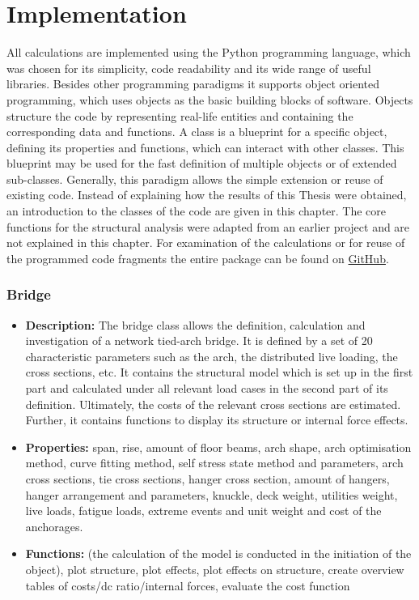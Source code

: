 \chapter{Implementation}
All calculations are implemented using the Python programming language, which was chosen for its simplicity, code readability and its wide range of useful libraries. Besides other programming paradigms it supports object oriented programming, which uses objects as the basic building blocks of software. Objects structure the code by representing real-life entities and containing the corresponding data and functions. A class is a blueprint for a specific object, defining its properties and functions, which can interact with other classes. This blueprint may be used for the fast definition of multiple objects or of extended sub-classes. Generally, this paradigm allows the simple extension or reuse of existing code. Instead of explaining how the results of this Thesis were obtained, an introduction to the classes of the code are given in this chapter. The core functions for the structural analysis were adapted from an earlier project and are not explained in this chapter. For examination of the calculations or for reuse of the programmed code fragments the entire package can be found on \href{https://github.com/uridmo/networkarchoptimization}{GitHub}.

\subsection*{Bridge}
\begin{itemize}
    \item {\bf Description:} The bridge class allows the definition, calculation and investigation of a network tied-arch bridge. It is defined by a set of 20 characteristic parameters such as the arch, the distributed live loading, the cross sections, etc. It contains the structural model which is set up in the first part and calculated under all relevant load cases in the second part of its definition. Ultimately, the costs of the relevant cross sections are estimated. Further, it contains functions to display its structure or internal force effects.
    \item {\bf Properties:} span, rise, amount of floor beams, arch shape, arch optimisation method, curve fitting method, self stress state method and parameters, arch cross sections, tie cross sections, hanger cross section, amount of hangers, hanger arrangement and parameters, knuckle, deck weight, utilities weight, live loads, fatigue loads, extreme events and unit weight and cost of the anchorages.
    \item {\bf Functions:} (the calculation of the model is conducted in the initiation of the object), plot structure, plot effects, plot effects on structure, create overview tables of costs/dc ratio/internal forces, evaluate the cost function
\end{itemize}

